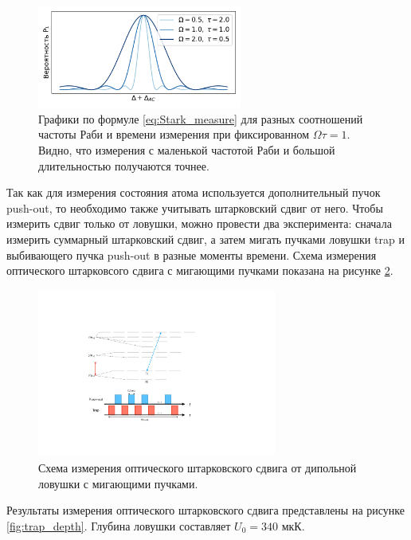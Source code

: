 \begin{figure}[H]
	\centering
	\includegraphics[width=0.6\textwidth]{images/Stark_measure_drawing.pdf}
	\caption{Графики по формуле \ref{eq:Stark_measure} для разных соотношений частоты Раби и времени измерения при фиксированном $\Omega\tau = 1$. Видно, что измерения с маленькой частотой Раби и большой длительностью получаются точнее.}
	\label{fig:Stark_drawing}
\end{figure}

Так как для измерения состояния атома используется дополнительный пучок push-out, то необходимо также учитывать штарковский сдвиг от него. Чтобы измерить сдвиг только от ловушки, можно провести два эксперимента: сначала измерить суммарный штарковский сдвиг, а затем мигать пучками ловушки trap и выбивающего пучка push-out в разные моменты времени. Схема измерения оптического штарковсого сдвига с мигающими пучками показана на рисунке \ref{fig:Stark_measure_scheme}.

\begin{figure}[H]
	\centering
	\includegraphics[width=0.7\textwidth]{images/measurement.pdf}
	\caption{Схема измерения оптического штарковского сдвига от дипольной ловушки с мигающими пучками.}
	\label{fig:Stark_measure_scheme}
\end{figure}

Результаты измерения оптического штарковского сдвига представлены на рисунке \ref{fig:trap_depth}. Глубина ловушки составляет $U_0 = 340 \text{ мкК}$.

